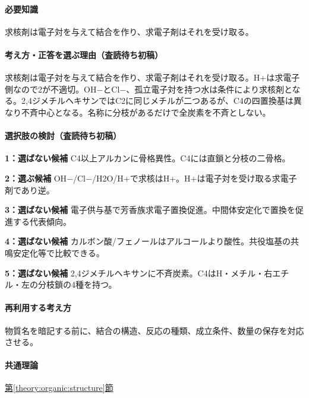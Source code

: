 \paragraph{必要知識} 求核剤は電子対を与えて結合を作り、求電子剤はそれを受け取る。

\paragraph{考え方・正答を選ぶ理由（査読待ち初稿）} 求核剤は電子対を与えて結合を作り、求電子剤はそれを受け取る。H+は求電子側なので2が不適切。OH−とCl−、孤立電子対を持つ水は条件により求核剤となる。2,4ジメチルヘキサンではC2に同じメチルが二つあるが、C4の四置換基は異なり不斉中心となる。名称に分枝があるだけで全炭素を不斉としない。

\paragraph{選択肢の検討（査読待ち初稿）}\mbox{}\par

\noindent\textbf{1：選ばない候補} C4以上アルカンに骨格異性。C4には直鎖と分枝の二骨格。\par

\noindent\textbf{2：選ぶ候補} OH−/Cl−/H2O/H+で求核はH+。H+は電子対を受け取る求電子剤であり逆。\par

\noindent\textbf{3：選ばない候補} 電子供与基で芳香族求電子置換促進。中間体安定化で置換を促進する代表傾向。\par

\noindent\textbf{4：選ばない候補} カルボン酸/フェノールはアルコールより酸性。共役塩基の共鳴安定化等で比較できる。\par

\noindent\textbf{5：選ばない候補} 2,4ジメチルヘキサンに不斉炭素。C4はH・メチル・右エチル・左の分枝鎖の4種を持つ。\par

\paragraph{再利用する考え方} 物質名を暗記する前に、結合の構造、反応の種類、成立条件、数量の保存を対応させる。

\paragraph{共通理論} \hyperref[theory:organic:structure]{第\ref*{theory:organic:structure}節}

